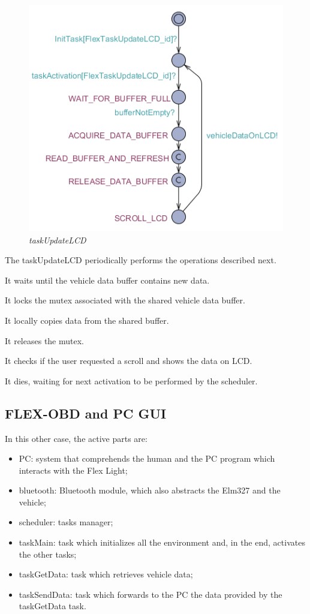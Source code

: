 \documentclass[paper=a4, fontsize=11pt]{scrartcl} %
\numberwithin{equation}{section} %
\numberwithin{figure}{section} %
\numberwithin{table}{section} %
\begin{document}
\begin{figure}[H]
  \centering
  \includegraphics[width=4.5in]{img/FLEX-OBD-LCD_taskUpdateLCD}
  \caption{\textit{taskUpdateLCD}}
\end{figure}

The taskUpdateLCD periodically performs the operations described next.

It waits until the vehicle data buffer contains new data.

It locks the mutex associated with the shared vehicle data buffer.

It locally copies data from the shared buffer.

It releases the mutex.

It checks if the user requested a scroll and shows the data on LCD.

It dies, waiting for next activation to be performed by the scheduler.


\subsection{FLEX-OBD and PC GUI}

In this other case, the active parts are:

\begin{itemize}
	\item PC: system that comprehends the human and the PC program which interacts with the Flex Light;
	\item bluetooth: Bluetooth module, which also abstracts the Elm327 and the vehicle;
	\item scheduler: tasks manager;
	\item taskMain: task which initializes all the environment and, in the end, activates the other tasks;
	\item taskGetData: task which retrieves vehicle data;
	\item taskSendData: task which forwards to the PC the data provided by the taskGetData task.
\end{itemize}
\end{document}

